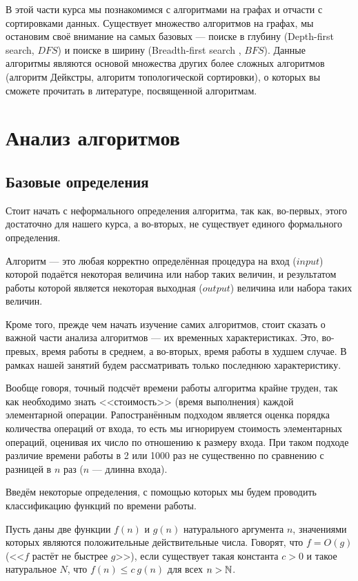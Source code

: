 В этой части курса мы познакомимся с алгоритмами на графах и отчасти с 
сортировками данных. Существует множество алгоритмов на графах, мы 
остановим своё внимание на самых базовых --- поиске в глубину 
(Depth-first search, $DFS$) и поиске в ширину (Breadth-first search
, $BFS$). Данные алгоритмы являются основой множества других более 
сложных алгоритмов (алгоритм Дейкстры, алгоритм топологической 
сортировки), о которых вы сможете прочитать в литературе, посвященной
алгоритмам.

\section{Анализ алгоритмов}
\subsection{Базовые определения}
Стоит начать с неформального определения алгоритма, так как,
во-первых, этого достаточно для нашего курса, а во-вторых, не существует
единого формального определения.

\begin{mydef}
    Алгоритм --- это любая корректно определённая процедура на
    вход ($input$) которой подаётся некоторая величина или набор таких
    величин, и результатом работы которой является некоторая выходная
    ($output$) величина или набора таких величин.
\end{mydef}

Кроме того, прежде чем начать изучение самих алгоритмов, стоит сказать о 
важной части анализа алгоритмов --- их временных характеристиках. Это,
во-превых, время работы в среднем, а во-вторых, время работы в худшем
случае. В рамках нашей занятий будем рассматривать только последнюю 
характеристику.

Вообще говоря, точный подсчёт времени работы алгоритма крайне труден,
так как необходимо знать <<стоимость>> (время выполнения) каждой
элементарной операции. Рапостранённым подходом является оценка порядка
количества операций от входа, то есть мы игнорируем стоимость
элементарных операций, оценивая их число по отношению к размеру входа.
При таком подходе различие времени работы в 2 или 1000 раз не
существенно по сравнению с разницей в $n$ раз ($n$ --- длинна входа).

Введём некоторые определения, с помощью которых мы будем проводить 
классификацию функций по времени работы. 

\begin{mydef}
	Пусть даны две функции $f(n)$ и $g(n)$ натурального аргумента $n$,
    значениями которых являются положительные действительные числа.
    Говорят, что $f = O(g)$ (<<$f$ растёт не быстрее $g$>>), если
    существует такая константа $c > 0$ и такое натуральное $N$, что
    $f(n) \leqslant c \ g(n)$ для всех $n > \mathbb{N}$.
\end{mydef}

